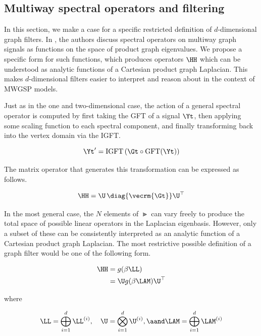 \subsection{Multiway spectral operators and filtering}

In this section, we make a case for a specific restricted definition of $d$-dimensional graph filters. In \cite{Stanley2020}, the authors discuss spectral operators on multiway graph signals as functions on the space of product graph eigenvalues. We propose a specific form for such functions, which produces operators $\HH$ which can be understood as analytic functions of a Cartesian product graph Laplacian. This makes $d$-dimensional filters easier to interpret and reason about in the context of MWGSP models.  

Just as in the one and two-dimensional case, the action of a general spectral operator is computed by first taking the GFT of a signal $\Yt$, then applying some scaling function to each spectral component, and finally transforming back into the vertex domain via the IGFT. 

\begin{equation}
    \Yt' = \text{IGFT} \left( \Gt \circ \text{GFT}(\Yt) \right)
\end{equation}

The matrix operator that generates this transformation can be expressed as follows. 

\begin{equation}
    \HH = \U \, \diag{\vecrm{\Gt}} \U^\top
\end{equation}

In the most general case, the $N$ elements of $\Gt$ can vary freely to produce the total space of possible linear operators in the Laplacian eigenbasis. However, only a subset of these can be consistently interpreted as an analytic function of a Cartesian product graph Laplacian. The most restrictive possible definition of a graph filter would be one of the following form. 

\begin{align}
    \HH &= g(\beta \LL) \notag \\
        &= \U g(\beta \LAM) \U^\top
\end{align}

where 

\begin{equation*}
    \LL = \bigoplus_{i=1}^d  \LL^{(i)}, \quad \U = \bigotimes_{i=1}^d  \U^{(i)}, \aand \LAM = \bigoplus_{i=1}^d  \LAM^{(i)}
\end{equation*}

